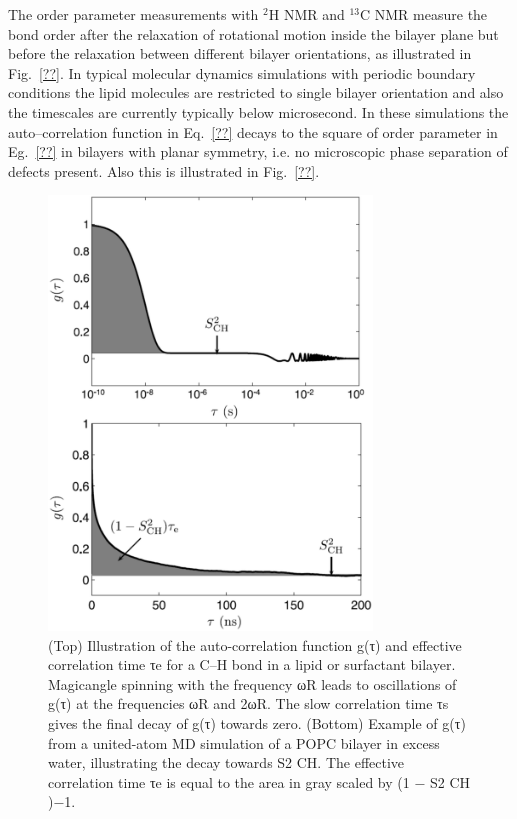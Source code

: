 \documentclass[aps,prl,superscriptaddress,twocolumn]{revtex4}
\begin{document}
The order parameter measurements with $^2$H NMR and $^{13}$C NMR measure the bond order after the relaxation
of rotational motion inside the bilayer plane but before the relaxation between different bilayer orientations,
as illustrated in Fig.~\ref{??}. In typical molecular dynamics simulations with periodic boundary conditions
the lipid molecules are restricted to single bilayer orientation and also the timescales are currently
typically below microsecond. In these simulations the auto--correlation function in Eq.~\ref{??} decays
to the square of order parameter in Eg.~\ref{??} in bilayers with planar symmetry, i.e. no microscopic phase separation of defects present.
Also this is illustrated in Fig.~\ref{??}.
\begin{figure}[]
  \includegraphics[width=8.6cm]{../Fig/correlationF.eps}
\newline
  \caption{\label{correlationF}
    (Top) Illustration of the auto-correlation function g(τ) and effective
correlation time τe for a C–H bond in a lipid or surfactant bilayer. Magicangle
spinning with the frequency ωR leads to oscillations of g(τ) at the
frequencies ωR and 2ωR. The slow correlation time τs gives the final decay
of g(τ) towards zero. (Bottom) Example of g(τ) from a united-atom MD
simulation of a POPC bilayer in excess water, illustrating the decay towards
S2
CH. The effective correlation time τe is equal to the area in gray scaled by
(1 − S2
CH
)−1.
} 
\end{figure}
\end{document}
